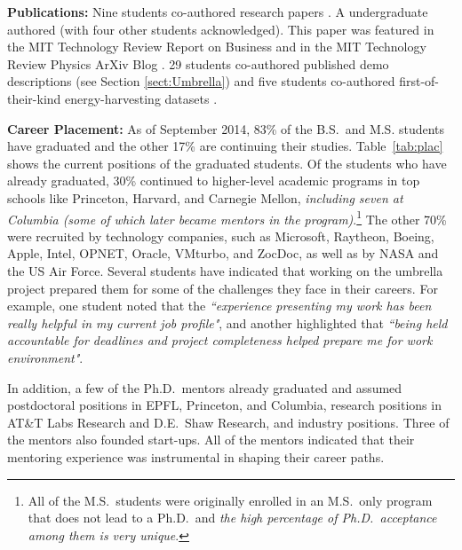 \documentclass[journal,twopages]{IEEEtran}
\begin{document}
\noindent\textbf{Publications:} Nine students co-authored research
papers \cite{KymEncapsulation, kinetic_SIG, sarik_more_2013,
  afsar_evaluating_2012, Gorlatova2013Prototyping,
  Gorlatova_Infocom2011, Gorlatova_TMC13, Wang_TMC12}. A
undergraduate authored \cite{kinetic_SIG} (with four other students
acknowledged). This paper was featured in the MIT Technology Review Report on
Business \cite{internetOfYouMITTechn} and in the MIT Technology Review
Physics ArXiv Blog \cite{humanMotionMITTechn}.  29 students co-authored
published demo descriptions
\cite{SeconDemoEnHANTs2010,MobiComDemo,MobiSys2011Demo,SenSys2011Demo,IDTechDemo2012,Margolies2013Demo}
(see Section \ref{sect:Umbrella}) and five students co-authored 
first-of-their-kind energy-harvesting datasets
\cite{columbia-enhants-light-energy-traces,columbia-kinetic-2014-05-13}.

\noindent\textbf{Career Placement:}
As of September 2014, 83\% of the B.S.\ and M.S. students have graduated and the other 17\% are continuing their
studies. Table~\ref{tab:plac} shows the current positions of the
graduated students.
Of the students who have already graduated, 
30\% continued to
higher-level academic programs in top schools like Princeton, Harvard,
and Carnegie Mellon, \emph{including seven at Columbia (some of which
  later became mentors in the program)}.\footnote{All of the M.S.\ students were originally enrolled in an  M.S.\ only
  program that does not lead to a Ph.D.\ and \emph{the high percentage
    of Ph.D.\ acceptance among them is very unique}.} 
The other 70\% were recruited by technology
companies, such as Microsoft, Raytheon, Boeing, Apple, Intel, OPNET,
Oracle, VMturbo, and ZocDoc, as well as by NASA and the US Air
Force. Several students have indicated that working on the umbrella project prepared them for some of the challenges they face in their careers. For example, one student noted that the \emph{``experience presenting my work has been really helpful in my current job profile"}, and another highlighted that \emph{``being held accountable for deadlines and project completeness helped prepare me for work environment"}.


In addition, a few of the Ph.D.\ mentors already graduated and assumed
postdoctoral positions in EPFL, Princeton, and Columbia, research
positions in AT\&T Labs Research and D.E.\ Shaw Research, and industry
positions. Three of the mentors also founded start-ups. All of the
mentors indicated that their mentoring experience was instrumental in
shaping their career paths.
\end{document}
